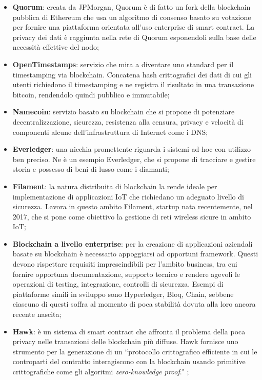 \begin{itemize}
            \item \textbf{Quorum}: creata da JPMorgan, Quorum è di fatto un fork della blockchain pubblica di Ethereum che usa un algoritmo di consenso basato su votazione per fornire una piattaforma orientata all'uso enterprise di smart contract. La privacy dei dati è raggiunta nella rete di Quorum esponendoli sulla base delle necessità effettive del nodo;
            \item \textbf{OpenTimestamps}: servizio che mira a diventare uno standard per il timestamping via blockchain. Concatena hash crittografici dei dati di cui gli utenti richiedono il timestamping e ne registra il risultato in una transazione bitcoin, rendendolo quindi pubblico e immutabile;
            \item \textbf{Namecoin}: servizio basato su blockchain che si propone di potenziare decentralizzazione, sicurezza, resistenza alla censura, privacy e velocità di componenti alcune dell'infrastruttura di Internet come i DNS;
            \item \textbf{Everledger}: una nicchia promettente riguarda i sistemi ad-hoc con utilizzo ben preciso. Ne è un esempio Everledger, che si propone di tracciare e gestire storia e possesso di beni di lusso come i diamanti;
            \item \textbf{Filament}: la natura distribuita di blockchain la rende ideale per implementazione di applicazioni IoT che richiedano un adeguato livello di sicurezza. Lavora in questo ambito Filament, startup nata recentemente, nel 2017, che si pone come obiettivo la gestione di reti wireless sicure in ambito IoT;
            \item \textbf{Blockchain a livello enterprise}: per la creazione di applicazioni aziendali basate su blockchain è necessario appoggiarsi ad opportuni framework. Questi devono rispettare requisiti imprescindibili per l'ambito business, tra cui fornire opportuna documentazione, supporto tecnico e rendere agevoli le operazioni di testing, integrazione, controlli di sicurezza. Esempi di piattaforme simili in sviluppo sono Hyperledger, Bloq, Chain, sebbene ciascuno di questi soffra al momento di poca stabilità dovuta alla loro ancora recente nascita;
            \item \textbf{Hawk}: è un sistema di smart contract che affronta il problema della poca privacy nelle transazioni delle blockchain più diffuse. Hawk fornisce uno strumento per la generazione di un ``protocollo crittografico efficiente in cui le controparti del contratto interagiscono con la blockchain usando primitive crittografiche come gli algoritmi \emph{zero-knowledge proof}." \cite{hawk};
        \end{itemize}

